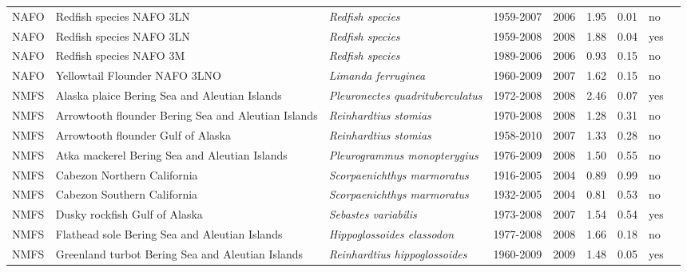 \begin{longtable}{p{1.8cm}p{4cm}p{4cm}ccccp{1.9cm}c}
  NAFO & Redfish species NAFO 3LN & \textit{Redfish species} & 1959-2007 & 2006 & 1.95 & 0.01 & no & \cite{NAFO-SC-REDFISHSPP3LN-1959-2007-PREFONTAINE} \\ 
  NAFO & Redfish species NAFO 3LN & \textit{Redfish species} & 1959-2008 & 2008 & 1.88 & 0.04 & yes & \cite{NAFO-SC-REDFISHSPP3LN-1959-2008-BAUM} \\ 
  NAFO & Redfish species NAFO 3M & \textit{Redfish species} & 1989-2006 & 2006 & 0.93 & 0.15 & no & \cite{NAFO-SC-REDFISHSPP3M-1989-2006-PREFONTAINE} \\ 
  NAFO & Yellowtail Flounder NAFO 3LNO & \textit{Limanda ferruginea} & 1960-2009 & 2007 & 1.62 & 0.15 & no & \cite{NAFO-SC-YELL3LNO-1960-2009-BAUM} \\ 
  NMFS & Alaska plaice Bering Sea and Aleutian Islands & \textit{Pleuronectes quadrituberculatus} & 1972-2008 & 2008 & 2.46 & 0.07 & yes & \cite{AFSC-ALPLAICBSAI-1972-2008-MELNYCHUK} \\ 
  NMFS & Arrowtooth flounder Bering Sea and Aleutian Islands & \textit{Reinhardtius stomias} & 1970-2008 & 2008 & 1.28 & 0.31 & no & \cite{AFSC-ARFLOUNDBSAI-1970-2008-STANTON} \\ 
  NMFS & Arrowtooth flounder Gulf of Alaska & \textit{Reinhardtius stomias} & 1958-2010 & 2007 & 1.33 & 0.28 & no & \cite{AFSC-ARFLOUNDGA-1958-2010-STANTON} \\ 
  NMFS & Atka mackerel Bering Sea and Aleutian Islands & \textit{Pleurogrammus monopterygius} & 1976-2009 & 2008 & 1.50 & 0.55 & no & \cite{AFSC-ATKABSAI-1976-2009-STANTON} \\ 
  NMFS & Cabezon Northern California & \textit{Scorpaenichthys marmoratus} & 1916-2005 & 2004 & 0.89 & 0.99 & no & \cite{AFSC-CABEZNCAL-1916-2005-STANTON} \\ 
  NMFS & Cabezon Southern California & \textit{Scorpaenichthys marmoratus} & 1932-2005 & 2004 & 0.81 & 0.53 & no & \cite{AFSC-CABEZSCAL-1932-2005-STANTON} \\ 
  NMFS & Dusky rockfish Gulf of Alaska & \textit{Sebastes variabilis} & 1973-2008 & 2007 & 1.54 & 0.54 & yes & \cite{AFSC-DUSROCKGA-1973-2008-MELNYCHUK} \\ 
  NMFS & Flathead sole Bering Sea and Aleutian Islands & \textit{Hippoglossoides elassodon} & 1977-2008 & 2008 & 1.66 & 0.18 & no & \cite{AFSC-FLSOLEBSAI-1977-2008-STANTON} \\ 
  NMFS & Greenland turbot Bering Sea and Aleutian Islands & \textit{Reinhardtius hippoglossoides} & 1960-2009 & 2009 & 1.48 & 0.05 & yes & \cite{AFSC-GHALBSAI-1960-2009-STANTON} \\ 

\end{longtable}
